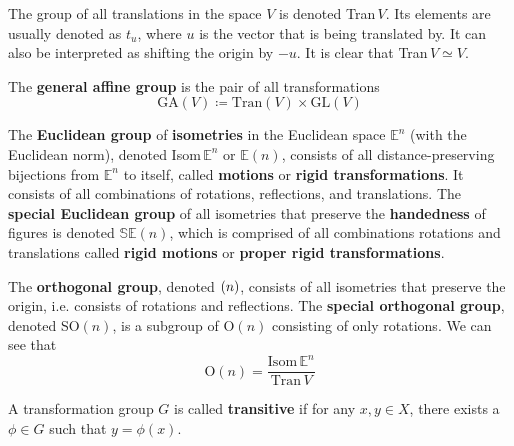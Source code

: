 \documentclass{article}
\let\O\relax
\DeclareMathOperator{\O}{O}
\newcounter{definition}[section]
\begin{document}
    \begin{definition}
      \label{def:translation-group}
      The group of all translations in the space $V$ is denoted Tran$\,V$. Its elements are usually denoted as $t_{u}$, where $u$ is the vector that is being translated by. It can also be interpreted as shifting the origin by $-u$. It is clear that Tran$\,V \simeq V$. 
    \end{definition}

    \begin{definition}
      \label{def:general-affine-group}
      The \textbf{general affine group} is the pair of all transformations
      \begin{equation}
        \text{GA} (V) \coloneqq \text{Tran}(V) \times \text{GL}(V)
      \end{equation}
    \end{definition}

    \begin{definition}[Isometries]
      \label{def:isometries}
      The \textbf{Euclidean group} of \textbf{isometries} in the Euclidean space $\mathbb{E}^{n}$ (with the Euclidean norm), denoted Isom$\, \mathbb{E}^{n}$ or $\mathbb{E}(n)$, consists of all distance-preserving bijections from $\mathbb{E}^{n}$ to itself, called \textbf{motions} or \textbf{rigid transformations}. It consists of all combinations of rotations, reflections, and translations. The \textbf{special Euclidean group} of all isometries that preserve the \textbf{handedness} of figures is denoted $\mathbb{SE}(n)$, which is comprised of all combinations rotations and translations called \textbf{rigid motions} or \textbf{proper rigid transformations}.
    \end{definition}

    \begin{definition}
      \label{def:orthogonal-group}
      The \textbf{orthogonal group}, denoted $\O(n)$, consists of all isometries that preserve the origin, i.e. consists of rotations and reflections. The \textbf{special orthogonal group}, denoted SO$(n)$, is a subgroup of O$(n)$ consisting of only rotations. We can see that 
      \begin{equation}
        \text{O}(n)=\frac{\text{Isom}\, \mathbb{E}^{n}}{\text{Tran}\,V}
      \end{equation}
    \end{definition}

    \begin{definition}[Transitive]
      \label{def:transitive}
      A transformation group $G$ is called \textbf{transitive} if for any $x, y \in X$, there exists a $\phi \in G$ such that $y = \phi(x)$. 
    \end{definition}
\end{document}
